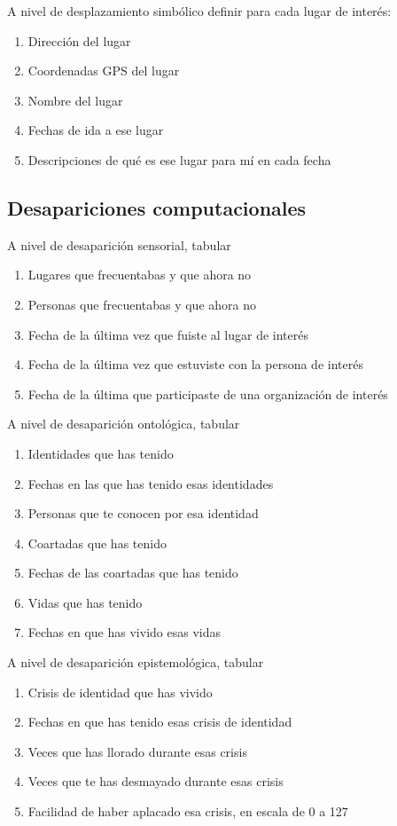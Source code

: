 \documentclass[./informes.tex]{subfiles}
\begin{document}
A nivel de desplazamiento simbólico definir para cada lugar de interés:

\begin{enumerate}
  \item Dirección del lugar
  \item Coordenadas GPS del lugar
  \item Nombre del lugar
  \item Fechas de ida a ese lugar
  \item Descripciones de qué es ese lugar para mí en cada fecha
\end{enumerate}



\subsection{Desapariciones computacionales}

A nivel de desaparición sensorial, tabular

\begin{enumerate}
  \item Lugares que frecuentabas y que ahora no
  \item Personas que frecuentabas y que ahora no
  \item Fecha de la última vez que fuiste al lugar de interés
  \item Fecha de la última vez que estuviste con la persona de interés
  \item Fecha de la última que participaste de una organización de interés
\end{enumerate}

A nivel de desaparición ontológica, tabular

\begin{enumerate}
  \item Identidades que has tenido
  \item Fechas en las que has tenido esas identidades
  \item Personas que te conocen por esa identidad
  \item Coartadas que has tenido
  \item Fechas de las coartadas que has tenido
  \item Vidas que has tenido
  \item Fechas en que has vivido esas vidas
\end{enumerate}

A nivel de desaparición epistemológica, tabular

\begin{enumerate}
  \item Crisis de identidad que has vivido
  \item Fechas en que has tenido esas crisis de identidad
  \item Veces que has llorado durante esas crisis
  \item Veces que te has desmayado durante esas crisis
  \item Facilidad de haber aplacado esa crisis, en escala de 0 a 127
\end{enumerate}
\end{document}
